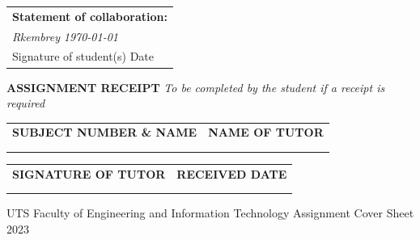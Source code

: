 \documentclass[a4paper,12pt]{article}
\begin{document}
\begin{tabularx}{\textwidth}{|>{\raggedright\arraybackslash}X|}
	\vspace{0.2cm}

	\noindent
	\textbf{Statement of collaboration:}                                                                                                                                                                                                          \\

	\vspace{0.01cm}
	\hfill \textit{Rkembrey} \hfill \textit{\today} \hfill                                                                                                                                                                                        \\
	Signature of student(s) \hfill \underline{\hspace{6cm}} \hfill Date \hfill \underline{\hspace{3cm}}                                                                                                                                           \\[0.3cm]
	\hline
\end{tabularx}

\vspace{0.6cm}
\noindent\hdashrule[0.5ex]{\textwidth}{0.5pt}{2pt}
\begin{center}
	\hfill \textbf{ASSIGNMENT RECEIPT} \hfill
	\small\textit{To be completed by the student if a receipt is required}
\end{center}

\noindent
\begin{tabularx}{\textwidth}{|Y|Y|}
	\hline
	\textbf{SUBJECT NUMBER \& NAME} & \textbf{NAME OF TUTOR} \\
	                                &                        \\
	                                &                        \\
	\hline
\end{tabularx}
\begin{tabularx}{\textwidth}{|Y|Y|}
	\hline
	\textbf{SIGNATURE OF TUTOR} & \textbf{RECEIVED DATE} \\
	                            &                        \\
	                            &                        \\
	\hline
\end{tabularx}
\vfill

\begin{center}
	UTS Faculty of Engineering and Information Technology \hfill
	Assignment Cover Sheet 2023
\end{center}
\end{document}
